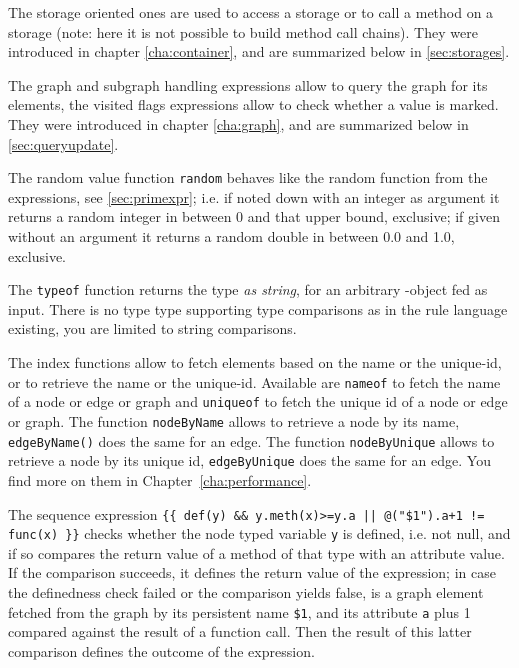 The storage oriented ones are used to access a storage or to call a method on a storage (note: here it is not possible to build method call chains). 
They were introduced in chapter \ref{cha:container}, and are summarized below in \ref{sec:storages}.

The graph and subgraph handling expressions allow to query the graph for its elements, the visited flags expressions allow to check whether a value is marked.
They were introduced in chapter \ref{cha:graph}, and are summarized below in \ref{sec:queryupdate}.

The random value function \texttt{random} behaves like the random function from the expressions, see \ref{sec:primexpr};
i.e. if noted down with an integer as argument it returns a random integer in between 0 and that upper bound, exclusive; if given without an argument it returns a random double in between 0.0 and 1.0, exclusive.

The \texttt{typeof} function returns the type \emph{as string}, for an arbitrary \GrG-object fed as input.
There is no type type supporting type comparisons as in the rule language existing, you are limited to string comparisons.

The index functions allow to fetch elements based on the name or the unique-id, or to retrieve the name or the unique-id.
Available are \texttt{nameof} to fetch the name of a node or edge or graph and \texttt{uniqueof} to fetch the unique id of a node or edge or graph.
The function \texttt{nodeByName} allows to retrieve a node by its name, \texttt{edgeByName()} does the same for an edge.
The function \texttt{nodeByUnique} allows to retrieve a node by its unique id, \texttt{edgeByUnique} does the same for an edge.
You find more on them in Chapter~\ref{cha:performance}.

\begin{example}
The sequence expression \verb#{{ def(y) && y.meth(x)>=y.a || @("$1").a+1 != func(x) }}# checks whether the node typed variable \texttt{y} is defined, i.e. not null, and if so compares the return value of a method of that type with an attribute value. If the comparison succeeds, it defines the return value of the expression; in case the definedness check failed or the comparison yields false, is a graph element fetched from the graph by its persistent name \verb#$1#, and its attribute \texttt{a} plus 1 compared against the result of a function call. Then the result of this latter comparison defines the outcome of the expression.
\end{example}


